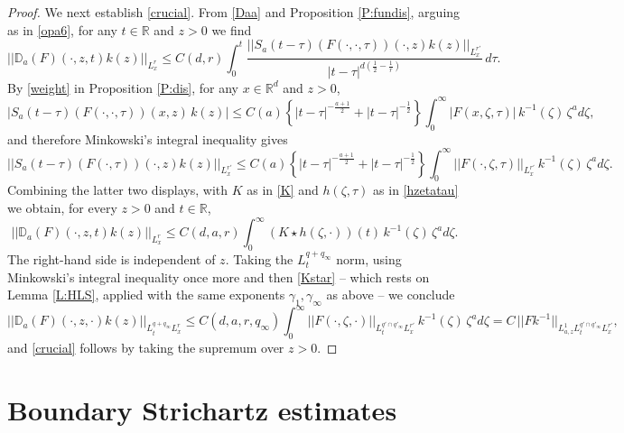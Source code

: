 \documentclass[11pt,letter]{amsart}
\def \R {\mathbb{R}}
\newcommand{\Rd}{\mathbb R^d}
\numberwithin{equation}{section}
\numberwithin{equation}{section}
\begin{document}
\begin{proof}
We next establish \eqref{crucial}. From \eqref{Daa} and Proposition \ref{P:fundis}, arguing as in \eqref{opa6}, for any $t\in \R$ and $z>0$ we find
\[
||\mathbb D_a(F)(\cdot,z,t) k(z)||_{L^r_x} \le C(d,r) \int_0^t \frac{||S_a(t-\tau)(F(\cdot,\cdot,\tau))(\cdot,z) k(z)||_{L^{r'}_x}}{|t-\tau|^{d(\frac 12 - \frac 1r)}}\, d\tau.
\]
By \eqref{weight} in Proposition \ref{P:dis}, for any $x\in \Rd$ and $z>0$,
\[
|S_a(t-\tau)(F(\cdot,\cdot,\tau))(x,z)\, k(z)| \le C(a)\left\{|t-\tau|^{-\frac{a+1}2} + |t-\tau|^{-\frac 12}\right\} \int_0^\infty |F(x,\zeta,\tau)|\, k^{-1}(\zeta)\, \zeta^a d\zeta,
\]
and therefore Minkowski's integral inequality gives
\[
||S_a(t-\tau)(F(\cdot,\tau))(\cdot,z)k(z)||_{L^{r'}_x} \le C(a)\left\{|t-\tau|^{-\frac{a+1}2} + |t-\tau|^{-\frac 12}\right\} \int_0^\infty ||F(\cdot,\zeta,\tau)||_{L^{r'}_x}\, k^{-1}(\zeta)\, \zeta^a d\zeta.
\]
Combining the latter two displays, with $K$ as in \eqref{K} and $h(\zeta,\tau)$ as in \eqref{hzetatau} we obtain, for every $z>0$ and $t\in \R$,
\[
||\mathbb D_a(F)(\cdot,z,t) k(z)||_{L^r_x} \le C(d,a,r) \int_0^\infty (K\star h(\zeta,\cdot))(t)\, k^{-1}(\zeta)\, \zeta^a d\zeta.
\]
The right-hand side is independent of $z$. Taking the $L^{q+q_\infty}_t$ norm, using Minkowski's integral inequality once more and then \eqref{Kstar} -- which rests on Lemma \ref{L:HLS}, applied with the same exponents $\gamma_1, \gamma_\infty$ as above -- we conclude
\[
||\mathbb D_a(F)(\cdot,z,\cdot)k(z)||_{L^{q+q_\infty}_t L^r_x} \le C(d,a,r,q_\infty) \int_0^\infty ||F(\cdot,\zeta,\cdot)||_{L^{q'\cap q'_\infty}_t L^{r'}_x}\, k^{-1}(\zeta)\, \zeta^a d\zeta = C\, ||F k^{-1}||_{L^1_{a,z} L^{q'\cap q'_\infty}_t L^{r'}_x},
\]
and \eqref{crucial} follows by taking the supremum over $z>0$.




\end{proof}




\section{Boundary Strichartz estimates}\label{S:bdry}
\end{document}
